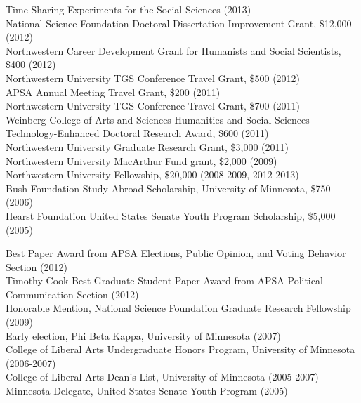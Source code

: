 \documentclass[12pt]{article}
\renewcommand{\section}[1]{\pagebreak[3]%
    \llap{\scshape\smash{\parbox[t]{\marginparwidth}{\raggedright {\color{lg}#1}}}}%
    \vspace{-\baselineskip}\par}
\newcommand{\entry}[1]{\indent {\color{lg}\guillemotright}\hspace{2pt}#1\vspace{.25em}\\}
\begin{document}
\section{Grants\\and\\Funding}
\entry{Time-Sharing Experiments for the Social Sciences (2013)}
\entry{National Science Foundation Doctoral Dissertation Improvement Grant, \$12,000 (2012)}
\entry{Northwestern Career Development Grant for Humanists and Social Scientists, \$400 (2012)}
\entry{Northwestern University TGS Conference Travel Grant, \$500 (2012)}
\entry{APSA Annual Meeting Travel Grant, \$200 (2011)}
\entry{Northwestern University TGS Conference Travel Grant, \$700 (2011)}
\entry{Weinberg College of Arts and Sciences Humanities and Social Sciences Technology-Enhanced Doctoral Research Award, \$600 (2011)}
\entry{Northwestern University Graduate Research Grant, \$3,000 (2011)}
\entry{Northwestern University MacArthur Fund grant, \$2,000 (2009)}
\entry{Northwestern University Fellowship, \$20,000 (2008-2009, 2012-2013)}
\entry{Bush Foundation Study Abroad Scholarship, University of Minnesota, \$750 (2006)}
\entry{Hearst Foundation United States Senate Youth Program Scholarship, \$5,000 (2005)}

\section{Honors\\and\\Awards}
\entry{Best Paper Award from APSA Elections, Public Opinion, and Voting Behavior Section (2012)}
\entry{Timothy Cook Best Graduate Student Paper Award from APSA Political Communication Section (2012)}
\entry{Honorable Mention, National Science Foundation Graduate Research Fellowship (2009)}
\entry{Early election, Phi Beta Kappa, University of Minnesota (2007)}
\entry{College of Liberal Arts Undergraduate Honors Program, University of Minnesota (2006-2007)}
\entry{College of Liberal Arts Dean's List, University of Minnesota (2005-2007)}
\entry{Minnesota Delegate, United States Senate Youth Program (2005)}
\end{document}

